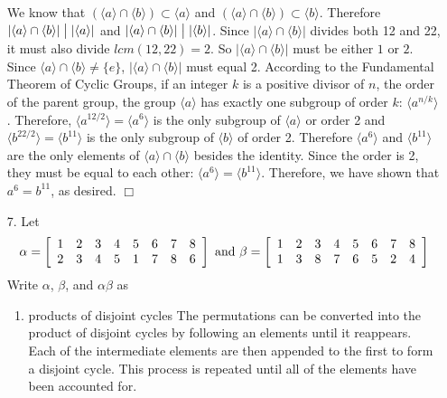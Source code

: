 \documentclass{article}
\begin{document}
\begin{enumerate}
\begin{flushleft}
We know that $(\langle a\rangle \cap \langle b\rangle) \subset \langle a\rangle$ and $(\langle a\rangle \cap \langle b\rangle) \subset \langle b\rangle$. Therefore $\lvert\langle a\rangle \cap \langle b\rangle\rvert \bigm| \lvert\langle a\rangle\rvert$ and $\lvert\langle a\rangle \cap \langle b\rangle\rvert \bigm| \lvert\langle b\rangle\rvert$. Since $\lvert\langle a\rangle \cap \langle b\rangle\rvert$ divides both 12 and 22, it must also divide $lcm(12, 22) = 2$. So $\lvert\langle a\rangle \cap \langle b\rangle\rvert$ must be either $1$ or $2$. Since $\langle a\rangle \cap \langle b\rangle \not=\{e\}$, $\lvert\langle a\rangle \cap \langle b\rangle\rvert$ must equal 2. According to the Fundamental Theorem of Cyclic Groups, if an integer $k$ is a positive divisor of $n$, the order of the parent group, the group $\langle a\rangle$ has exactly one subgroup of order $k$: $\langle a^{n/k}\rangle$. Therefore, $\langle a^{12/2}\rangle = \langle a^6\rangle$ is the only subgroup of $\langle a\rangle$ or order 2 and $\langle b^{22/2}\rangle = \langle b^11\rangle$ is the only subgroup of $\langle b\rangle$ of order 2. Therefore $\langle a^6\rangle$ and $\langle b^11\rangle$ are the only elements of $\langle a\rangle \cap \langle b\rangle$ besides the identity. Since the order is 2, they must be equal to each other: $\langle a^6\rangle = \langle b^11\rangle$. Therefore, we have shown that $a^6 = b^{11}$, as desired. $\Box$
\end{flushleft}
\item[7.] Let
$$\alpha = \left[ \begin{array} { l l l l l l l l } { 1 } & { 2 } & { 3 } & { 4 } & { 5 } & { 6 } & { 7 } & { 8 } \\ { 2 } & { 3 } & { 4 } & { 5 } & { 1 } & { 7 } & { 8 } & { 6 } \end{array} \right]\text{ and } \beta = \left[ \begin{array} { l l l l l l l l } { 1 } & { 2 } & { 3 } & { 4 } & { 5 } & { 6 } & { 7 } & { 8 } \\ { 1 } & { 3 } & { 8 } & { 7 } & { 6 } & { 5 } & { 2 } & { 4 } \end{array} \right]$$
\newline
Write $\alpha$, $\beta$, and $\alpha\beta$ as
\begin{enumerate}
    \item products of disjoint cycles\newline
    The permutations can be converted into the product of disjoint cycles by following an elements until it reappears. Each of the intermediate elements are then appended to the first to form a disjoint cycle. This process is repeated until all of the elements have been accounted for.

\end{enumerate}
\end{enumerate}
\end{document}
